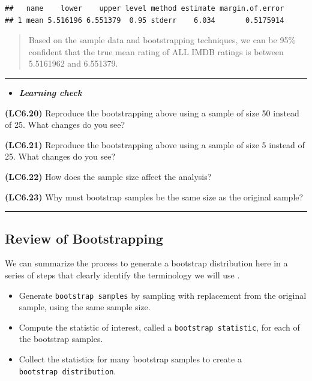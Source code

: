 \documentclass[]{tufte-book}
\providecommand{\tightlist}{%
  \setlength{\itemsep}{0pt}\setlength{\parskip}{0pt}}
\newenvironment{rmdblock}[1]
  {\begin{shaded*}
  \begin{itemize}
  \renewcommand{\labelitemi}{
    \raisebox{-.7\height}[0pt][0pt]{
    }
  }
  \item
  }
  {
  \end{itemize}
  \end{shaded*}
  }
\newenvironment{learncheck}
  {\begin{rmdblock}{warning}}
  {\end{rmdblock}}
\begin{document}
\begin{verbatim}
##   name    lower    upper level method estimate margin.of.error
## 1 mean 5.516196 6.551379  0.95 stderr    6.034       0.5175914
\end{verbatim}

\begin{quote}
Based on the sample data and bootstrapping techniques, we can be 95\%
confident that the true mean rating of ALL IMDB ratings is between
5.5161962 and 6.551379.
\end{quote}

\begin{center}\rule{\linewidth}{\linethickness}\end{center}

\begin{learncheck}
\textbf{\emph{Learning check}}
\end{learncheck}

\textbf{(LC6.20)} Reproduce the bootstrapping above using a sample of
size 50 instead of 25. What changes do you see?

\textbf{(LC6.21)} Reproduce the bootstrapping above using a sample of
size 5 instead of 25. What changes do you see?

\textbf{(LC6.22)} How does the sample size affect the analysis?

\textbf{(LC6.23)} Why must bootstrap samples be the same size as the
original sample?

\begin{center}\rule{\linewidth}{\linethickness}\end{center}

\subsection{Review of Bootstrapping}\label{review-of-bootstrapping}

We can summarize the process to generate a bootstrap distribution here
in a series of steps that clearly identify the terminology we will use
\citep{lock2012}.

\begin{itemize}
\tightlist
\item
  Generate \texttt{bootstrap\ samples} by sampling with replacement from
  the original sample, using the same sample size.
\item
  Compute the statistic of interest, called a
  \texttt{bootstrap\ statistic}, for each of the bootstrap samples.
\item
  Collect the statistics for many bootstrap samples to create a
  \texttt{bootstrap\ distribution}.
\end{itemize}
\end{document}

